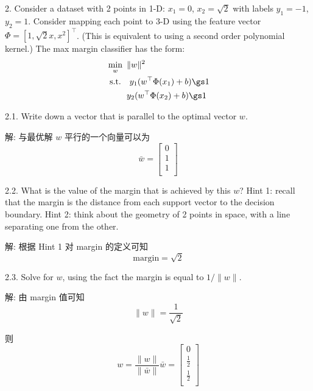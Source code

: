 \documentclass[openany]{ctexbook}
\theoremstyle{kaiti}
\theoremstyle{normal}
\begin{document}
2. Consider a dataset with 2 points in 1-D: $x_1 = 0$, $x_2 = \sqrt{2}$ with labels $ y_1 = -1$, $y_2 = 1$. Consider mapping each point to 3-D using the feature vector $\Phi = [1, \sqrt{2}x, x^2]^{\top}$. (This is equivalent to using a second order polynomial kernel.) The max margin classifier has the form:
\begin{equation}
  \begin{aligned}
    &\min_w~\|w\|^2   \\
    &~\mathrm{s.t.}~~~y_1(w^{\top} \Phi(x_1)+b)\gs1 \\
    &\quad\quad~y_2(w^{\top}\Phi(x_2)+b)\gs1 \\
  \end{aligned}
\end{equation}

2.1. Write down a vector that is parallel to the optimal vector $w$.

解: 与最优解 $w$ 平行的一个向量可以为
\begin{equation}
  \bar{w}=
    \begin{bmatrix}
      0\\ 1\\ 1\\
    \end{bmatrix}
\end{equation}

2.2. What is the value of the margin that is achieved by this $w$? Hint 1: recall that the margin is the distance from each support vector to the decision boundary. Hint 2: think about the geometry of 2 points in space, with a line separating one from the other.

解: 根据 Hint 1 对 margin 的定义可知
\begin{equation}
  \mathrm{margin}=\sqrt{2}
\end{equation}

2.3. Solve for $w$, using the fact the margin is equal to $1/\|w\|$.

解: 由 margin 值可知
\begin{equation}
  \|w\|=\frac{1}{\sqrt{2}}
\end{equation}

则
\begin{equation}
  w=\frac{\|w\|}{\|\bar{w}\|}\bar{w}=
  \begin{bmatrix}
    0\\ \frac{1}{2}\\ \frac{1}{2}\\
  \end{bmatrix}
\end{equation}
\end{document}
